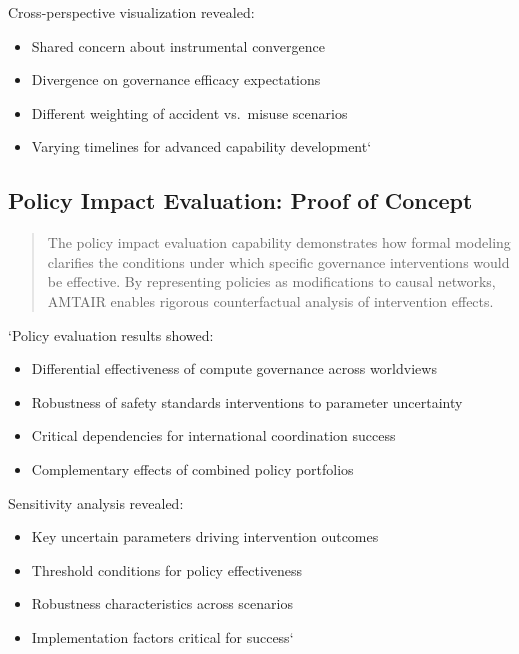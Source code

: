 \documentclass[]{book}
\providecommand{\tightlist}{%
  \setlength{\itemsep}{0pt}\setlength{\parskip}{0pt}}
\begin{document}
Cross-perspective visualization revealed:

\begin{itemize}
\tightlist
\item
  Shared concern about instrumental convergence
\item
  Divergence on governance efficacy expectations
\item
  Different weighting of accident vs.~misuse scenarios
\item
  Varying timelines for advanced capability development`
\end{itemize}

\subsection{Policy Impact Evaluation: Proof of
Concept}\label{sec-policy-impact}

\begin{quote}
The policy impact evaluation capability demonstrates how formal modeling
clarifies the conditions under which specific governance interventions
would be effective. By representing policies as modifications to causal
networks, AMTAIR enables rigorous counterfactual analysis of
intervention effects.
\end{quote}

`Policy evaluation results showed:

\begin{itemize}
\tightlist
\item
  Differential effectiveness of compute governance across worldviews
\item
  Robustness of safety standards interventions to parameter uncertainty
\item
  Critical dependencies for international coordination success
\item
  Complementary effects of combined policy portfolios
\end{itemize}

Sensitivity analysis revealed:

\begin{itemize}
\tightlist
\item
  Key uncertain parameters driving intervention outcomes
\item
  Threshold conditions for policy effectiveness
\item
  Robustness characteristics across scenarios
\item
  Implementation factors critical for success`
\end{itemize}
\end{document}
